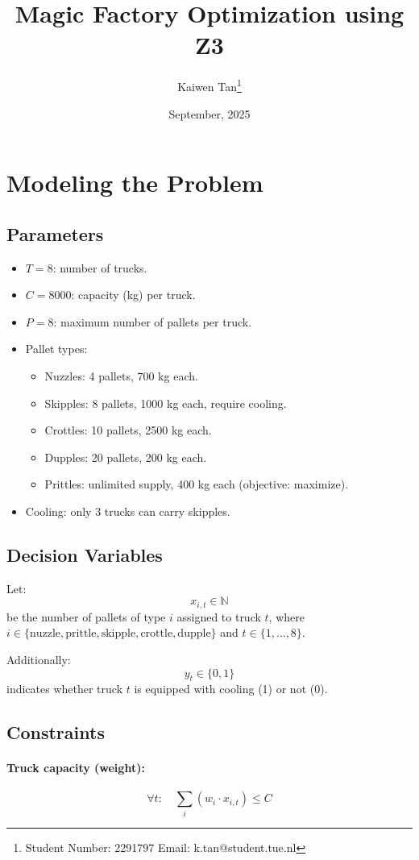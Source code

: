 \documentclass{article}
\title{Magic Factory Optimization using Z3}
\author{Kaiwen Tan\thanks{Student Number: 2291797 Email: k.tan@student.tue.nl}}
\date{September, 2025}
\begin{document}
\maketitle

\section{Modeling the Problem}

\subsection{Parameters}
\begin{itemize}
  \item $T = 8$: number of trucks.
  \item $C = 8000$: capacity (kg) per truck.
  \item $P = 8$: maximum number of pallets per truck.
  \item Pallet types:
    \begin{itemize}
      \item Nuzzles: 4 pallets, 700 kg each.
      \item Skipples: 8 pallets, 1000 kg each, require cooling.
      \item Crottles: 10 pallets, 2500 kg each.
      \item Dupples: 20 pallets, 200 kg each.
      \item Prittles: unlimited supply, 400 kg each (objective: maximize).
    \end{itemize}
  \item Cooling: only 3 trucks can carry skipples.
\end{itemize}

\subsection{Decision Variables}
Let:
\[
x_{i,t} \in \mathbb{N}
\]
be the number of pallets of type $i$ assigned to truck $t$, where $i \in \{\text{nuzzle}, \text{prittle}, \text{skipple}, \text{crottle}, \text{dupple}\}$ and $t \in \{1, \ldots, 8\}$.

Additionally:
\[
y_t \in \{0,1\}
\]
indicates whether truck $t$ is equipped with cooling (1) or not (0).

\subsection{Constraints}
\paragraph{Truck capacity (weight):}
\[
\forall t: \quad \sum_i (w_i \cdot x_{i,t}) \leq C
\]
\end{document}
